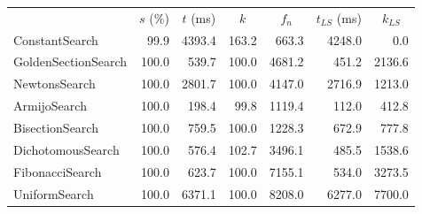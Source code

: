 \begin{center}
\label{tab:performance_results_NegativeEntropy}
\begin{tabular}{|l|r|r|r|r|r|r|}
\hline
\rowcolor{gray!25}
\multicolumn{1}{|c|}{Line Search Name} & \multicolumn{1}{c|}{$s$ (\%)} & \multicolumn{1}{c|}{$t$ (ms)} & \multicolumn{1}{c|}{$k$} & \multicolumn{1}{c|}{$f_n$} & \multicolumn{1}{c|}{$t_{LS}$ (ms)} & \multicolumn{1}{c|}{$k_{LS}$} \\
ConstantSearch & 99.9 & 4393.4 & 163.2 & 663.3 & 4248.0 & 0.0 \\
GoldenSectionSearch & 100.0 & 539.7 & 100.0 & 4681.2 & 451.2 & 2136.6 \\
NewtonsSearch & 100.0 & 2801.7 & 100.0 & 4147.0 & 2716.9 & 1213.0 \\
ArmijoSearch & 100.0 & 198.4 & 99.8 & 1119.4 & 112.0 & 412.8 \\
BisectionSearch & 100.0 & 759.5 & 100.0 & 1228.3 & 672.9 & 777.8 \\
DichotomousSearch & 100.0 & 576.4 & 102.7 & 3496.1 & 485.5 & 1538.6 \\
FibonacciSearch & 100.0 & 623.7 & 100.0 & 7155.1 & 534.0 & 3273.5 \\
UniformSearch & 100.0 & 6371.1 & 100.0 & 8208.0 & 6277.0 & 7700.0 \\

\hline
\end{tabular}
\end{center}

